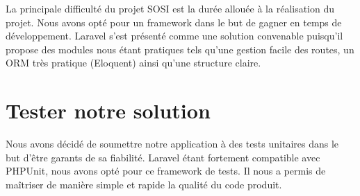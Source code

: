 La principale difficulté du projet SOSI est la durée allouée à la réalisation du projet.
Nous avons opté pour un framework dans le but de gagner en temps de développement. Laravel
s'est présenté comme une solution convenable puisqu'il propose des modules nous étant pratiques
tels qu'une gestion facile des routes, un ORM très pratique (Eloquent) ainsi qu'une structure
claire.

\section{Tester notre solution}

Nous avons décidé de soumettre notre application à des tests unitaires dans le but d'être garants de sa fiabilité. Laravel étant fortement compatible avec PHPUnit, nous avons opté pour ce framework de tests. Il nous a permis de maîtriser de manière simple et rapide la qualité du code produit.
